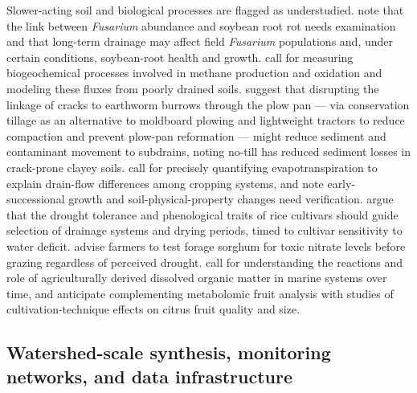 Slower-acting soil and biological processes are flagged as understudied. \textcite{Han2017} note that the link between \emph{Fusarium} abundance and soybean root rot needs examination and that long-term drainage may affect field \emph{Fusarium} populations and, under certain conditions, soybean-root health and growth. \textcite{Kumar2014b} call for measuring biogeochemical processes involved in methane production and oxidation and modeling these fluxes from poorly drained soils. \textcite{Shipitalo2004} suggest that disrupting the linkage of cracks to earthworm burrows through the plow pan --- via conservation tillage as an alternative to moldboard plowing and lightweight tractors to reduce compaction and prevent plow-pan reformation --- might reduce sediment and contaminant movement to subdrains, noting no-till has reduced sediment losses in crack-prone clayey soils. \textcite{Daigh2014} call for precisely quantifying evapotranspiration to explain drain-flow differences among cropping systems, and \textcite{Tian2012} note early-successional growth and soil-physical-property changes need verification. \textcite{DarziNaftchali2017b} argue that the drought tolerance and phenological traits of rice cultivars should guide selection of drainage systems and drying periods, timed to cultivar sensitivity to water deficit. \textcite{Nash2017} advise farmers to test forage sorghum for toxic nitrate levels before grazing regardless of perceived drought. \textcite{Manninen2018} call for understanding the reactions and role of agriculturally derived dissolved organic matter in marine systems over time, and \textcite{GiménezValero2024} anticipate complementing metabolomic fruit analysis with studies of cultivation-technique effects on citrus fruit quality and size.

\subsection{Watershed-scale synthesis, monitoring networks, and data infrastructure}

